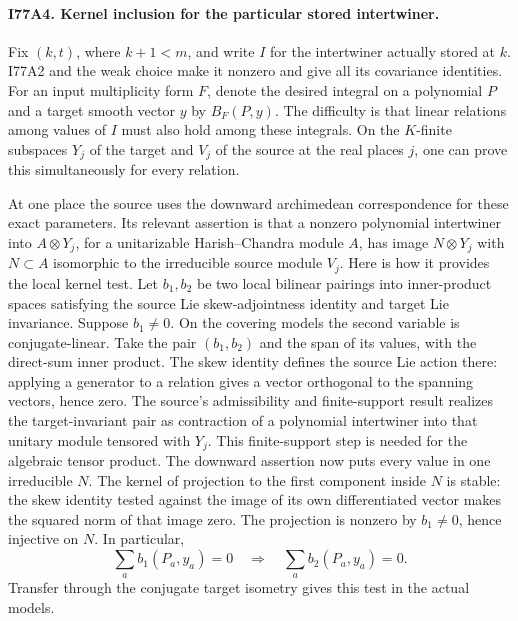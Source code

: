 
\paragraph{I77A4. Kernel inclusion for the particular stored intertwiner.}
Fix $(k,t)$, where $k+1<m$, and write $I$ for the intertwiner actually
stored at $k$. I77A2 and the weak choice make it nonzero and give all
its covariance identities. For an input multiplicity form $F$, denote
the desired integral on a polynomial $P$ and a target smooth vector
$y$ by $B_F(P,y)$. The difficulty is that linear relations among
values of $I$ must also hold among these integrals. On the
$K$-finite subspaces $Y_j$ of the target and $V_j$ of the source
at the real places $j$, one can prove this simultaneously for every
relation.

At one place the source uses the downward archimedean correspondence
for these exact parameters. Its relevant assertion is that a nonzero
polynomial intertwiner into $A\otimes Y_j$, for a unitarizable
Harish--Chandra module $A$, has image $N\otimes Y_j$ with
$N\subset A$ isomorphic to the irreducible source module $V_j$.
Here is how it provides the local kernel test. Let $b_1,b_2$ be two
local bilinear pairings into inner-product spaces satisfying the
source Lie skew-adjointness identity and target Lie invariance.
Suppose $b_1\ne0$. On the covering models the second variable is
conjugate-linear. Take the pair $(b_1,b_2)$ and the span of its
values, with the direct-sum inner product. The skew identity defines
the source Lie action there: applying a generator to a relation
gives a vector orthogonal to the spanning vectors, hence zero.
The source's admissibility and finite-support result realizes the
target-invariant pair as contraction of a polynomial intertwiner
into that unitary module tensored with $Y_j$. This finite-support
step is needed for the algebraic tensor product. The downward
assertion now puts every value in one irreducible $N$. The kernel
of projection to the first component inside $N$ is stable: the
skew identity tested against the image of its own differentiated
vector makes the squared norm of that image zero. The projection
is nonzero by $b_1\ne0$, hence injective on $N$. In particular,
\[
       \sum_a b_1(P_a,y_a)=0\quad\Longrightarrow\quad
                      \sum_a b_2(P_a,y_a)=0 .
\]
Transfer through the conjugate target isometry gives this test in
the actual models.

